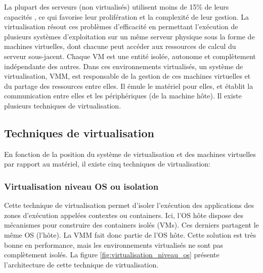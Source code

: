 \par\noindent La plupart des serveurs (non virtualisés) utilisent moins de 15\% de leurs capacités \cite{online1}, ce qui favorise leur prolifération et la complexité de leur gestion. La virtualisation résout ces problèmes d’efficacité en permettant l'exécution de plusieurs systèmes d’exploitation sur un même serveur physique sous la forme de machines virtuelles, dont chacune peut accéder aux ressources de calcul du serveur sous-jacent. Chaque VM est une entité isolée, autonome et complètement indépendante des autres. Dans ces environnements virtualisés, un système de virtualisation, \ac{VMM}, est responsable de la gestion de ces machines virtuelles et du partage des ressources entre elles. Il émule le matériel pour elles, et établit la communication entre elles et les périphériques (de la machine hôte). Il existe plusieurs techniques de virtualisation.

\subsection{Techniques de virtualisation}
En fonction de la position du système de virtualisation et des machines virtuelles par rapport au matériel, il existe cinq techniques de virtualisation:

\subsubsection{Virtualisation niveau OS ou isolation}
Cette technique de virtualisation permet d'isoler l'exécution des applications des zones d'exécution appelées contextes ou containers. Ici, l'\acs{OS} hôte dispose des mécanismes pour construire des containers isolés (VMs). Ces derniers partagent le même OS (l'hôte). La \acs{VMM} fait donc partie de l'OS hôte. Cette solution est très bonne en performance, mais les environnements virtualisés ne sont pas complètement isolés. La figure \ref{fig:virtualisation_niveau_os} présente l'architecture de cette technique de virtualisation.
    
